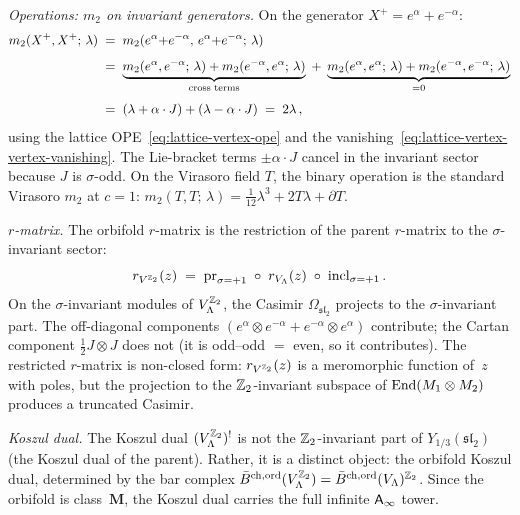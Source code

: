 \begin{computation}
\smallskip
\noindent
\emph{Operations: $m_2$ on invariant generators.}
On the generator $X^+ = e^\alpha + e^{-\alpha}$:
\begin{align}
m_2(X^+, X^+;\, \lambda)
&\;=\;
m_2(e^\alpha{+}e^{-\alpha},\, e^\alpha{+}e^{-\alpha};\, \lambda)
\notag
\\[4pt]
&\;=\;
\underbrace{m_2(e^\alpha, e^{-\alpha};\, \lambda)
+ m_2(e^{-\alpha}, e^\alpha;\, \lambda)}_{\text{cross terms}}
\;+\;
\underbrace{m_2(e^\alpha, e^\alpha;\, \lambda)
+ m_2(e^{-\alpha}, e^{-\alpha};\, \lambda)}_{ = 0}
\notag
\\[4pt]
&\;=\;
(\lambda + \alpha \cdot J)
+ (\lambda - \alpha \cdot J)
\;=\;
2\lambda\,,
\label{eq:z2-orbifold-m2-xplus}
\end{align}
using the lattice OPE~\eqref{eq:lattice-vertex-ope}
and the vanishing~\eqref{eq:lattice-vertex-vertex-vanishing}.
The Lie-bracket terms $\pm\alpha \cdot J$ cancel in
the invariant sector because $J$ is $\sigma$-odd.
On the Virasoro field $T$, the binary operation is
the standard Virasoro $m_2$ at $c = 1$:
$m_2(T, T;\, \lambda) = \tfrac{1}{12}\lambda^3
+ 2T\lambda + \partial T$.

\smallskip
\noindent
\emph{$r$-matrix.}
The orbifold $r$-matrix is the restriction of the parent
$r$-matrix to the $\sigma$-invariant sector:
\begin{equation}\label{eq:z2-orbifold-r-matrix}
r_{V^{\mathbb{Z}_2}}(z)
\;=\;
\mathrm{pr}_{\sigma = +1}\;\circ\;
r_{V_\Lambda}(z)
\;\circ\;
\mathrm{incl}_{\sigma = +1}\,.
\end{equation}
On the $\sigma$-invariant modules of $V_\Lambda^{\mathbb{Z}_2}$, the
Casimir $\Omega_{\mathfrak{sl}_2}$ projects to the
$\sigma$-invariant part. The off-diagonal components
$(e^\alpha \otimes e^{-\alpha} + e^{-\alpha} \otimes e^\alpha)$
contribute; the Cartan component $\tfrac{1}{2} J \otimes J$
does not (it is odd--odd $= $ even, so it contributes).
The restricted $r$-matrix is non-closed form:
$r_{V^{\mathbb{Z}_2}}(z)$ is a meromorphic function of~$z$
with poles, but the projection to the $\mathbb{Z}_2$-invariant
subspace of $\operatorname{End}(M_1 \otimes M_2)$ produces a truncated
Casimir.

\smallskip
\noindent
\emph{Koszul dual.}
The Koszul dual $(V_\Lambda^{\mathbb{Z}_2})^!$ is not the
$\mathbb{Z}_2$-invariant part of $Y_{1/3}(\mathfrak{sl}_2)$
(the Koszul dual of the parent). Rather, it is a distinct
object: the orbifold Koszul dual, determined by the bar
complex $\bar{B}^{\mathrm{ch,ord}}(V_\Lambda^{\mathbb{Z}_2})
= \bar{B}^{\mathrm{ch,ord}}(V_\Lambda)^{\mathbb{Z}_2}$.
Since the orbifold is class~$\mathbf{M}$, the Koszul dual
carries the full infinite $\mathsf{A}_{\infty}$ tower.


\end{computation}
